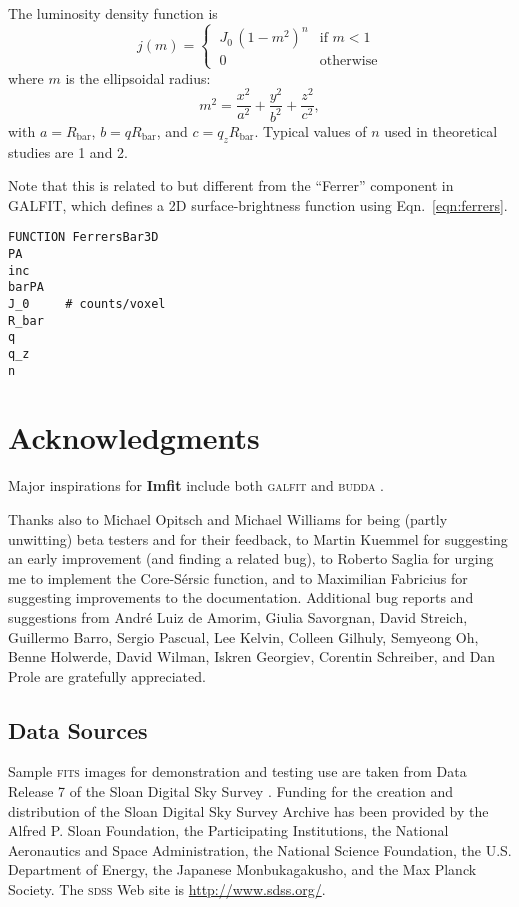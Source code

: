 \documentclass[10pt,a4paper,article]{memoir}
\newcommand{\Imfit}{\textbf{Imfit}}
\newcommand{\rbar}{\ensuremath{R_{\mathrm{bar}}}}
\begin{document}
The luminosity density function is
\begin{equation}\label{eqn:ferrers}
 j(m) = 
  \begin{cases} 
   \: J_0 \, (1 - m^{2})^{n} & \text{if } m < 1 \\
   \: 0                      & \text{otherwise}
  \end{cases}
\end{equation}
where $m$ is the ellipsoidal radius:
\begin{equation}
m^2 =  \frac{x^2}{a^2} + \frac{y^2}{b^2} + \frac{z^2}{c^2} ,
\end{equation}
with $a = \rbar$, $b = q \rbar$, and $c = q_{z} \rbar$. Typical values of $n$
used in theoretical studies are 1 and 2.

Note that this is related to but different from the ``Ferrer'' component
in GALFIT, which defines a 2D surface-brightness function using Eqn.~\ref{eqn:ferrers}.

\begin{verbatim}
FUNCTION FerrersBar3D
PA
inc
barPA
J_0     # counts/voxel
R_bar
q
q_z
n
\end{verbatim}




\chapter{Acknowledgments}

Major inspirations for \Imfit{} include both \textsc{galfit} \citep{peng02,peng10} and 
\textsc{budda} \citep{desouza04,gadotti08}.

Thanks also to Michael Opitsch and Michael Williams for being (partly
unwitting) beta testers and for their feedback, to Martin Kuemmel for
suggesting an early improvement (and finding a related bug), to Roberto
Saglia for urging me to implement the Core-S{\'e}rsic function, and to
Maximilian Fabricius for suggesting improvements to the documentation.
Additional bug reports and suggestions from Andr{\'e} Luiz de Amorim,
Giulia Savorgnan, David Streich, Guillermo Barro, Sergio Pascual, Lee
Kelvin, Colleen Gilhuly, Semyeong Oh, Benne Holwerde, David Wilman, 
Iskren Georgiev, Corentin Schreiber, and Dan Prole are gratefully appreciated.


\section{Data Sources}

Sample \textsc{fits} images for demonstration and testing use are taken
from Data Release 7 \citep{abazajian09} of the Sloan Digital Sky Survey
\citep{york00}. Funding for the creation and distribution of the Sloan
Digital Sky Survey Archive has been provided by the Alfred P. Sloan
Foundation, the Participating Institutions, the National Aeronautics and
Space Administration, the National Science Foundation, the U.S.
Department of Energy, the Japanese Monbukagakusho, and the Max Planck
Society. The \textsc{sdss} Web site is \url{http://www.sdss.org/}.
\end{document}
